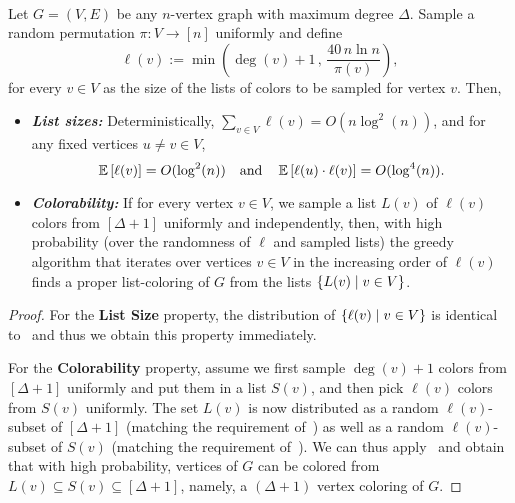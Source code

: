 \begin{corollary}\label{thm:apst} ~ \\
	Let $G=(V,E)$ be any $n$-vertex graph with maximum degree $\Delta$. 
	Sample a random permutation $\pi: V \rightarrow [n]$ uniformly and define 
	\[
	\ell(v) := \min \left( \deg(v)+1\, , \,  \frac{40\,n\ln{n}}{\pi(v)}\right),
	\]
	for every $v \in V$ as the size of the lists of colors to be sampled for vertex $v$. Then,  
	\begin{itemize}
		\item \emph{\textbf{List sizes:}} Deterministically, $\sum_{v \in V} \ell(v) = O(n\log^2\!{(n)})$, and for any fixed vertices $u \neq v \in V$, 
		\[
		\operatorname*{{\mathbb{E}}}\left[\ell(v)\right] = O(\log^2\!{(n)}) \quad \text{and} \quad \operatorname*{{\mathbb{E}}}\left[\ell(u) \cdot \ell(v)\right] = O(\log^{4}\!{(n)}). 
		\] 
		\item \emph{\textbf{Colorability:}} If for every vertex $v \in V$, we sample a list $L(v)$ of $\ell(v)$ colors from $[\Delta+1]$ uniformly and independently, then, with high probability (over the randomness of $\ell$ and sampled lists) the greedy 
		algorithm that iterates over vertices $v \in V$ in the increasing order of $\ell(v)$ finds a proper list-coloring of $G$ from the lists 
		$\left\{ L(v) \mid v \in V \right\}$. 
	\end{itemize}
\end{corollary}
\begin{proof}
\noindent 
	For the \textbf{List Size} property, the distribution of $\left\{ \ell(v) \mid v \in V \right\}$ is identical to~ and thus we obtain this property immediately. 

	For the \textbf{Colorability} property, assume we first sample $\deg(v)+1$ colors from $[\Delta+1]$ uniformly and put them in a list $S(v)$, and then pick $\ell(v)$ colors from $S(v)$ uniformly. The set $L(v)$ is now
	distributed as a random $\ell(v)$-subset of $[\Delta+1]$ (matching the requirement of~) as well as a random $\ell(v)$-subset of $S(v)$ (matching the requirement of~). 
	We can thus apply~ and obtain that with high probability, vertices of $G$ can be colored from $L(v) \subseteq S(v) \subseteq [\Delta+1]$, namely, a $(\Delta+1)$ vertex coloring of $G$. 
\end{proof}

	
